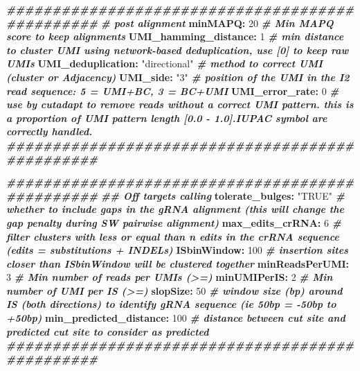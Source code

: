 \documentclass[
]{article}
\newenvironment{Shaded}{\begin{snugshade}}{\end{snugshade}}
\newcommand{\AttributeTok}[1]{\textcolor[rgb]{0.74,0.68,0.62}{#1}}
\newcommand{\CommentTok}[1]{\textcolor[rgb]{0.00,0.40,1.00}{\textbf{\textit{#1}}}}
\newcommand{\DecValTok}[1]{\textcolor[rgb]{0.27,0.67,0.26}{#1}}
\newcommand{\FunctionTok}[1]{\textcolor[rgb]{1.00,0.58,0.35}{\textbf{#1}}}
\newcommand{\KeywordTok}[1]{\textcolor[rgb]{0.26,0.66,0.93}{\textbf{#1}}}
\newcommand{\StringTok}[1]{\textcolor[rgb]{0.02,0.61,0.04}{#1}}
\begin{document}
\begin{Shaded}
\begin{Highlighting}[]
\CommentTok{\#\#\#\#\#\#\#\#\#\#\#\#\#\#\#\#\#\#\#\#\#\#\#\#\#\#\#\#\#\#\#\#\#\#\#\#\#\#\#\#\#\#\#\#\#\#\#\#}
\CommentTok{\# post alignment}
\FunctionTok{minMAPQ}\KeywordTok{:}\AttributeTok{ }\DecValTok{20}\CommentTok{                       \# Min MAPQ score to keep alignments }
\FunctionTok{UMI\_hamming\_distance}\KeywordTok{:}\AttributeTok{ }\DecValTok{1}\CommentTok{           \# min distance to cluster UMI using network{-}based deduplication, use [0] to keep raw UMIs}
\FunctionTok{UMI\_deduplication}\KeywordTok{:}\AttributeTok{ }\StringTok{"directional"}\CommentTok{  \# method to correct UMI (cluster or Adjacency)}
\FunctionTok{UMI\_side}\KeywordTok{:}\AttributeTok{ }\StringTok{"3"}\CommentTok{                     \# position of the UMI in the I2 read sequence: 5 = UMI+BC, 3 = BC+UMI}
\FunctionTok{UMI\_error\_rate}\KeywordTok{:}\AttributeTok{ }\DecValTok{0}\CommentTok{                 \# use by cutadapt to remove reads without a correct UMI pattern. this is a proportion of UMI pattern length [0.0 {-} 1.0].IUPAC symbol are correctly handled.}
\CommentTok{\#\#\#\#\#\#\#\#\#\#\#\#\#\#\#\#\#\#\#\#\#\#\#\#\#\#\#\#\#\#\#\#\#\#\#\#\#\#\#\#\#\#\#\#\#\#\#\#}


\CommentTok{\#\#\#\#\#\#\#\#\#\#\#\#\#\#\#\#\#\#\#\#\#\#\#\#\#\#\#\#\#\#\#\#\#\#\#\#\#\#\#\#\#\#\#\#\#\#\#\#}
\CommentTok{\#\# Off targets calling}
\FunctionTok{tolerate\_bulges}\KeywordTok{:}\AttributeTok{ }\StringTok{"TRUE"}\CommentTok{           \# whether to include gaps in the gRNA alignment (this will change the gap penalty during SW pairwise alignment)}
\FunctionTok{max\_edits\_crRNA}\KeywordTok{:}\AttributeTok{ }\DecValTok{6}\CommentTok{                \# filter clusters with less or equal than n edits in the crRNA sequence (edits = substitutions + INDELs)}
\FunctionTok{ISbinWindow}\KeywordTok{:}\AttributeTok{ }\DecValTok{100}\CommentTok{                  \# insertion sites closer than \textquotesingle{}ISbinWindow\textquotesingle{} will be clustered together}
\FunctionTok{minReadsPerUMI}\KeywordTok{:}\AttributeTok{ }\DecValTok{3}\CommentTok{                 \# Min number of reads per UMIs (\textgreater{}=)}
\FunctionTok{minUMIPerIS}\KeywordTok{:}\AttributeTok{ }\DecValTok{2}\CommentTok{                    \# Min number of UMI per IS (\textgreater{}=)}
\FunctionTok{slopSize}\KeywordTok{:}\AttributeTok{ }\DecValTok{50}\CommentTok{                      \# window size (bp) around IS (both directions) to identify gRNA sequence (ie 50bp = {-}50bp to +50bp)}
\FunctionTok{min\_predicted\_distance}\KeywordTok{:}\AttributeTok{ }\DecValTok{100}\CommentTok{       \# distance between cut site and predicted cut site to consider as predicted}
\CommentTok{\#\#\#\#\#\#\#\#\#\#\#\#\#\#\#\#\#\#\#\#\#\#\#\#\#\#\#\#\#\#\#\#\#\#\#\#\#\#\#\#\#\#\#\#\#\#\#\#}


\end{Highlighting}
\end{Shaded}
\end{document}
